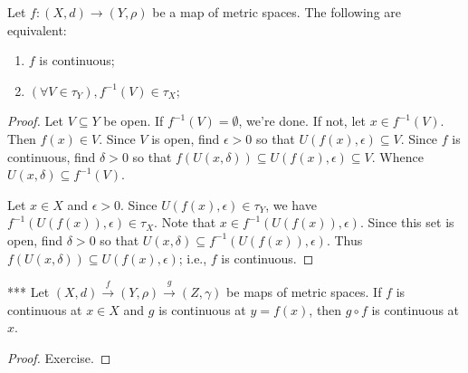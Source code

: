     \begin{proposition}
        Let $f:(X,d) \rightarrow (Y,\rho)$ be a map of metric spaces. The following are equivalent:
            \begin{enumerate}[label = (\arabic*),itemsep=1pt,topsep=3pt]
                \item $f$ is continuous;
                \item $(\forall V \in \tau_Y),f^{-1}(V) \in \tau_X$;
            \end{enumerate}
    \end{proposition}
        \begin{proof}
            Let $V \subseteq Y$ be open. If $f^{-1}(V) = \emptyset$, we're done. If not, let $x \in f^{-1}(V)$. Then $f(x) \in V$. Since $V$ is open, find $\epsilon > 0$ so that $U(f(x),\epsilon) \subseteq V$. Since $f$ is continuous, find $\delta > 0$ so that $f(U(x,\delta)) \subseteq U(f(x),\epsilon) \subseteq V$. Whence $U(x,\delta) \subseteq f^{-1}(V)$.

            Let $x \in X$ and $\epsilon > 0$. Since $U(f(x),\epsilon) \in \tau_Y$, we have $f^{-1}(U(f(x)),\epsilon) \in \tau_X$. Note that $x \in f^{-1}(U(f(x)),\epsilon)$. Since this set is open, find $\delta > 0$ so that $U(x,\delta) \subseteq f^{-1}(U(f(x)),\epsilon)$. Thus $f(U(x,\delta)) \subseteq U(f(x),\epsilon)$; i.e., $f$ is continuous.
        \end{proof}

    \begin{proposition}***
        Let $(X,d) \xrightarrow{f} (Y,\rho) \xrightarrow{g} (Z,\gamma)$ be maps of metric spaces. If $f$ is continuous at $x \in X$ and $g$ is continuous at $y = f(x)$, then $g \circ f$ is continuous at $x$.
    \end{proposition}
        \begin{proof}
            Exercise.
        \end{proof}

